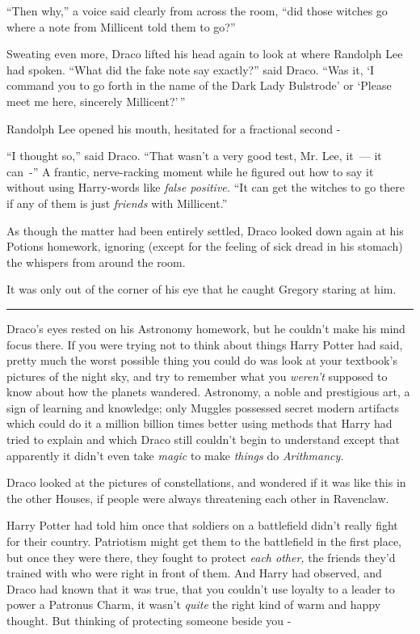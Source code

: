 ``Then why,'' a voice said clearly from across the room, ``did those witches go where a note from Millicent told them to go?''

Sweating even more, Draco lifted his head again to look at where Randolph Lee had spoken. ``What did the fake note say exactly?'' said Draco. ``Was it, `I command you to go forth in the name of the Dark Lady Bulstrode' or `Please meet me here, sincerely Millicent?'\,''

Randolph Lee opened his mouth, hesitated for a fractional second -

``I thought so,'' said Draco. ``That wasn't a very good test, Mr. Lee, it~--- it can~-'' A frantic, nerve-racking moment while he figured out how to say it without using Harry-words like \emph{false positive.} ``It can get the witches to go there if any of them is just \emph{friends} with Millicent.''

As though the matter had been entirely settled, Draco looked down again at his Potions homework, ignoring (except for the feeling of sick dread in his stomach) the whispers from around the room.

It was only out of the corner of his eye that he caught Gregory staring at him.

\begin{center}\rule{3in}{0.4pt}\end{center}

Draco's eyes rested on his Astronomy homework, but he couldn't make his mind focus there. If you were trying not to think about things Harry Potter had said, pretty much the worst possible thing you could do was look at your textbook's pictures of the night sky, and try to remember what you \emph{weren't} supposed to know about how the planets wandered. Astronomy, a noble and prestigious art, a sign of learning and knowledge; only Muggles possessed secret modern artifacts which could do it a million billion times better using methods that Harry had tried to explain and which Draco still couldn't begin to understand except that apparently it didn't even take \emph{magic} to make \emph{things} do \emph{Arithmancy.}

Draco looked at the pictures of constellations, and wondered if it was like this in the other Houses, if people were always threatening each other in Ravenclaw.

Harry Potter had told him once that soldiers on a battlefield didn't really fight for their country. Patriotism might get them to the battlefield in the first place, but once they were there, they fought to protect \emph{each other,} the friends they'd trained with who were right in front of them. And Harry had observed, and Draco had known that it was true, that you couldn't use loyalty to a leader to power a Patronus Charm, it wasn't \emph{quite} the right kind of warm and happy thought. But thinking of protecting someone beside you -

